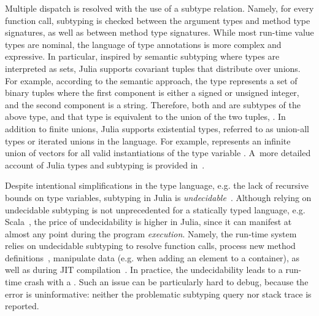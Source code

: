 
Multiple dispatch is resolved with the use of a subtype relation.
Namely, for every function call, subtyping is checked between
the argument types and method type signatures,
as well as between method type signatures.
While most run-time value types are nominal, %
the language of type annotations is more complex and expressive. 
In particular, inspired by semantic subtyping
where types are interpreted as sets,
Julia supports covariant tuples that distribute over unions.
For example, according to the semantic approach, the type 
 represents a set of binary
tuples where the first component is either a signed or unsigned integer,
and the second component is a string. Therefore, both
 and  are subtypes
of the above type, and that type is equivalent to the union of the two
tuples, .
In addition to finite unions, Julia supports existential types, referred to as
union-all types or iterated unions in the language. 
For example, 
represents an infinite union of vectors  for all valid
instantiations  of the type variable .
A~more detailed account of Julia types and subtyping
is provided in~.

Despite intentional simplifications in the type language,
e.g. the lack of recursive bounds on type variables,
subtyping in Julia is \emph{undecidable}~\cite{TODO}.
Although relying on undecidable subtyping is not unprecedented
for a statically typed language, e.g. Scala~\cite{bib:hu:dot-undec:2020},
the price of undecidability
is higher in Julia, since it
can manifest at almost any point during the program \emph{execution}.
Namely, the run-time system relies on undecidable subtyping
to resolve function calls,
process new method definitions~\cite{bib:belyakova:world-age:oopsla:2020},
manipulate data (e.g. when adding an element to a container),
as well as during JIT compilation~\cite{bib:pelenitsyn:type-stability:oopsla:2021}.
In practice, the undecidability
leads to a run-time crash with a .
Such an issue can be particularly hard to debug,
because the error is uninformative: neither the problematic subtyping query
nor stack trace is reported.

